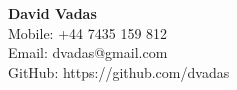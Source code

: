 \documentclass[]{article}
\begin{document}
\hrulefill
\begin{center}
\Huge{\textbf{David Vadas}}\\
\vspace{0.5cm}
\normalsize
Mobile: +44 7435 159 812\\
Email: dvadas@gmail.com\\ %
GitHub: https://github.com/dvadas
\end{center}
\hrulefill
\\



\end{document}

